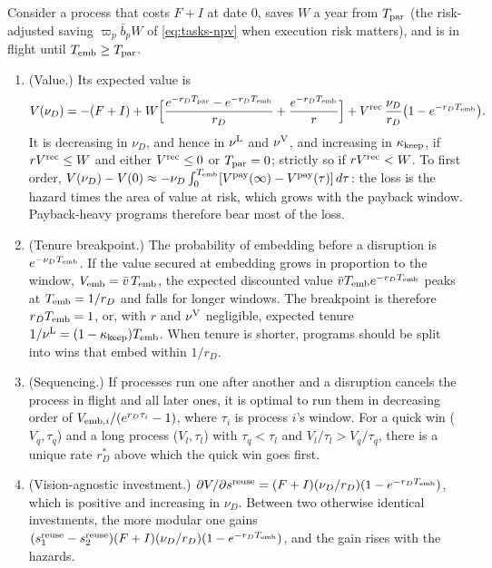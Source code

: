 \begin{proposition}\label{prop:ext-shocks}
Consider a process that costs $F+I$ at date 0, saves $W$ a year from $T_{\rm par}$ (the risk-adjusted saving $\varpi_p\bar b_pW$ of \eqref{eq:tasks-npv} when execution risk matters), and is in flight until $T_{\rm emb}\ge T_{\rm par}$.
\begin{enumerate}
\item[(a)] (Value.) Its expected value is
\begin{equation}\label{eq:ext-Vshock}
V(\nu_D)=-(F+I)+W\Bigl[\frac{e^{-r_DT_{\rm par}}-e^{-r_DT_{\rm emb}}}{r_D}+\frac{e^{-r_DT_{\rm emb}}}{r}\Bigr]+V^{\rm rec}\,\frac{\nu_D}{r_D}\bigl(1-e^{-r_DT_{\rm emb}}\bigr).
\end{equation}
It is decreasing in $\nu_D$, and hence in $\nu^{\rm L}$ and $\nu^{\rm V}$, and increasing in $\kappa_{\rm keep}$, if $rV^{\rm rec}\le W$ and either $V^{\rm rec}\le0$ or $T_{\rm par}=0$; strictly so if $rV^{\rm rec}<W$. To first order, $V(\nu_D)-V(0)\approx-\nu_D\int_0^{T_{\rm emb}}[V^{\rm pay}(\infty)-V^{\rm pay}(\tau)]\,d\tau$: the loss is the hazard times the area of value at risk, which grows with the payback window. Payback-heavy programs therefore bear most of the loss.
\item[(b)] (Tenure breakpoint.) The probability of embedding before a disruption is $e^{-\nu_DT_{\rm emb}}$. If the value secured at embedding grows in proportion to the window, $V_{\rm emb}=\bar v\,T_{\rm emb}$, the expected discounted value $\bar vT_{\rm emb}e^{-r_DT_{\rm emb}}$ peaks at $T_{\rm emb}=1/r_D$ and falls for longer windows. The breakpoint is therefore $r_DT_{\rm emb}=1$, or, with $r$ and $\nu^{\rm V}$ negligible, expected tenure $1/\nu^{\rm L}=(1-\kappa_{\rm keep})T_{\rm emb}$. When tenure is shorter, programs should be split into wins that embed within $1/r_D$.
\item[(c)] (Sequencing.) If processes run one after another and a disruption cancels the process in flight and all later ones, it is optimal to run them in decreasing order of $V_{{\rm emb},i}/(e^{r_D\tau_i}-1)$, where $\tau_i$ is process $i$'s window. For a quick win ($V_q,\tau_q$) and a long process ($V_l,\tau_l$) with $\tau_q<\tau_l$ and $V_l/\tau_l>V_q/\tau_q$, there is a unique rate $r_D^*$ above which the quick win goes first.
\item[(d)] (Vision-agnostic investment.) $\partial V/\partial s^{\rm reuse}=(F+I)(\nu_D/r_D)(1-e^{-r_DT_{\rm emb}})$, which is positive and increasing in $\nu_D$. Between two otherwise identical investments, the more modular one gains $(s^{\rm reuse}_1-s^{\rm reuse}_2)(F+I)(\nu_D/r_D)(1-e^{-r_DT_{\rm emb}})$, and the gain rises with the hazards.
\end{enumerate}
\end{proposition}

